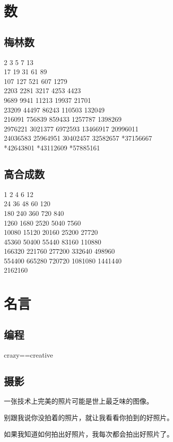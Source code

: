 \documentclass{article}
\begin{document}
\section{数}
\subsection{梅林数}
2 3 5 7 13\\
17 19 31 61 89 \\
107 127 521 607 1279\\
2203 2281 3217 4253 4423\\
9689 9941 11213 19937 21701\\
23209 44497 86243 110503 132049\\
216091 756839 859433 1257787 1398269\\
2976221 3021377 6972593 13466917 20996011\\
24036583 25964951 30402457 32582657 *37156667\\
*42643801 *43112609 *57885161 

\subsection{高合成数}
1 2 4 6 12\\
24 36 48 60 120\\
180 240 360 720 840\\
1260 1680 2520 5040 7560\\
10080 15120 20160 25200 27720\\
45360 50400 55440 83160 110880\\
166320 221760 277200 332640 498960\\
554400 665280 720720  1081080 1441440\\
2162160

\section{名言}
\subsection{编程}
crazy==creative
\subsection{摄影}
一张技术上完美的照片可能是世上最乏味的图像。

别跟我说你没拍着的照片，就让我看看你拍到的好照片。

如果我知道如何拍出好照片，我每次都会拍出好照片了。
\end{document}
